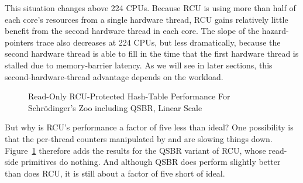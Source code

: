 This situation changes above 224 CPUs.
Because RCU is using more than half of each core's resources from a
single hardware thread, RCU gains relatively little benefit from the
second hardware thread in each core.
The slope of the hazard-pointers trace also decreases at 224 CPUs, but
less dramatically,
because the second hardware thread is able to fill in the time
that the first hardware thread is stalled due to memory-barrier latency.
As we will see in later sections, this second-hardware-thread
advantage depends on the workload.

\begin{figure}[tb]
\centering
{}
\caption{Read-Only RCU-Protected Hash-Table Performance For Schr\"odinger's Zoo including QSBR, Linear Scale}
\label{fig:datastruct:Read-Only RCU-Protected Hash-Table Performance For Schroedinger's Zoo including QSBR, Linear Scale}
\end{figure}

But why is RCU's performance a factor of five less than ideal?
One possibility is that the per-thread counters manipulated by
 and  are slowing things down.
Figure~\ref{fig:datastruct:Read-Only RCU-Protected Hash-Table Performance For Schroedinger's Zoo including QSBR, Linear Scale}
therefore adds the results for the QSBR variant of RCU, whose read-side
primitives do nothing.
And although QSBR does perform slightly better than does RCU, it is still
about a factor of five short of ideal.

